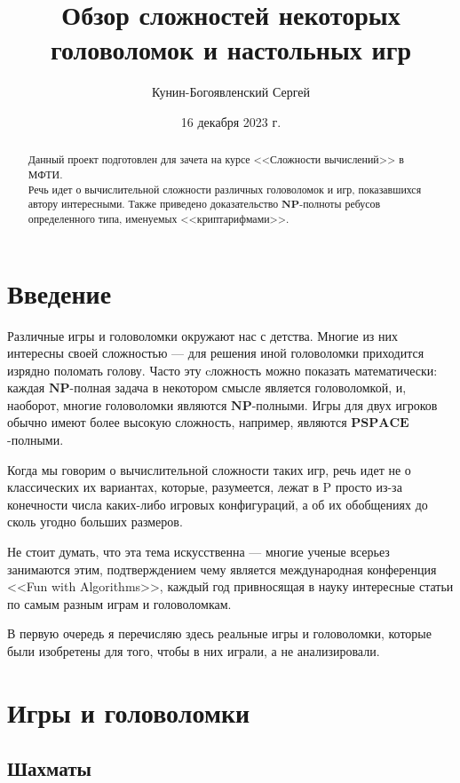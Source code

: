 \documentclass{article}
\title{\bf Обзор сложностей некоторых головоломок и настольных игр}
\author{Кунин-Богоявленский Сергей}
\date{16 декабря 2023 г.}
\begin{document}
\maketitle

\begin{abstract}
Данный проект подготовлен для зачета на курсе <<Сложности вычислений>> в МФТИ. \\
Речь идет о вычислительной сложности различных головоломок и игр, показавшихся автору интересными. Также приведено доказательство $\mathbf{NP}$-полноты ребусов определенного типа, именуемых <<криптарифмами>>.
\end{abstract}

\section*{Введение}

Различные игры и головоломки окружают нас с детства. Многие из них интересны своей сложностью --- для решения иной головоломки приходится изрядно поломать голову. Часто эту cложность можно показать математически: каждая $\mathbf{NP}$-полная задача в некотором смысле является головоломкой, и, наоборот, многие головоломки являются $\mathbf{NP}$-полными. Игры для двух игроков обычно имеют более высокую сложность, например, являются $\mathbf{PSPACE}$-полными.

Когда мы говорим о вычислительной сложности таких игр, речь идет не о классических их вариантах, которые, разумеется, лежат в P просто из-за конечности числа каких-либо игровых конфигураций, а об их обобщениях до сколь угодно больших размеров.

Не стоит думать, что эта тема искусственна --- многие ученые всерьез занимаются этим, подтверждением чему является международная конференция <<Fun with Algorithms>>, каждый год привносящая в науку интересные статьи по самым разным играм и головоломкам.


В первую очередь я перечисляю здесь реальные игры и головоломки, которые были изобретены для того, чтобы в них играли, а не анализировали. 

\section*{Игры и головоломки}


\subsection*{Шахматы}
\end{document}
